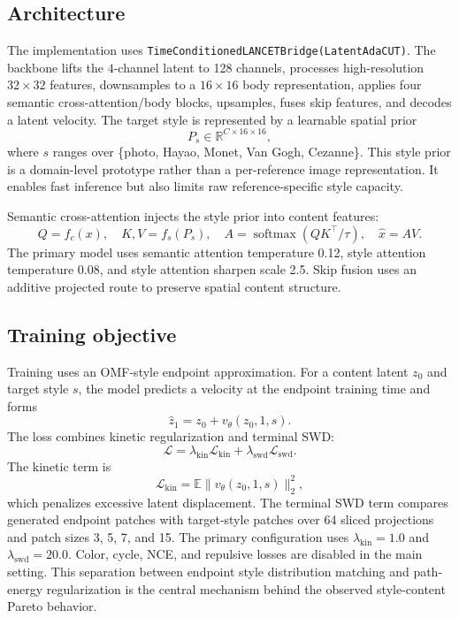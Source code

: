 \documentclass{article}
\begin{document}
\subsection{Architecture}
The implementation uses \texttt{TimeConditionedLANCETBridge(LatentAdaCUT)}. The backbone lifts the $4$-channel latent to 128 channels, processes high-resolution $32 \times 32$ features, downsamples to a $16 \times 16$ body representation, applies four semantic cross-attention/body blocks, upsamples, fuses skip features, and decodes a latent velocity. The target style is represented by a learnable spatial prior
\begin{equation}
    P_s \in \mathbb{R}^{C \times 16 \times 16},
\end{equation}
where $s$ ranges over \{photo, Hayao, Monet, Van Gogh, Cezanne\}. This style prior is a domain-level prototype rather than a per-reference image representation. It enables fast inference but also limits raw reference-specific style capacity.

Semantic cross-attention injects the style prior into content features:
\begin{equation}
    Q=f_c(x), \quad K,V=f_s(P_s), \quad A=\operatorname{softmax}(QK^\top/\tau), \quad \hat{x}=AV .
\end{equation}
The primary model uses semantic attention temperature 0.12, style attention temperature 0.08, and style attention sharpen scale 2.5. Skip fusion uses an additive projected route to preserve spatial content structure.

\subsection{Training objective}
Training uses an OMF-style endpoint approximation. For a content latent $z_0$ and target style $s$, the model predicts a velocity at the endpoint training time and forms
\begin{equation}
    \hat{z}_1 = z_0 + v_\theta(z_0,1,s).
\end{equation}
The loss combines kinetic regularization and terminal SWD:
\begin{equation}
    \mathcal{L} = \lambda_{\mathrm{kin}}\mathcal{L}_{\mathrm{kin}} + \lambda_{\mathrm{swd}}\mathcal{L}_{\mathrm{swd}}.
\end{equation}
The kinetic term is
\begin{equation}
    \mathcal{L}_{\mathrm{kin}} = \mathbb{E}\|v_\theta(z_0,1,s)\|_2^2,
\end{equation}
which penalizes excessive latent displacement. The terminal SWD term compares generated endpoint patches with target-style patches over 64 sliced projections and patch sizes 3, 5, 7, and 15. The primary configuration uses $\lambda_{\mathrm{kin}}=1.0$ and $\lambda_{\mathrm{swd}}=20.0$. Color, cycle, NCE, and repulsive losses are disabled in the main setting. This separation between endpoint style distribution matching and path-energy regularization is the central mechanism behind the observed style-content Pareto behavior.
\end{document}
